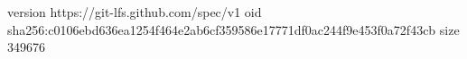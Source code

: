 version https://git-lfs.github.com/spec/v1
oid sha256:c0106ebd636ea1254f464e2ab6cf359586e17771df0ac244f9e453f0a72f43cb
size 349676
